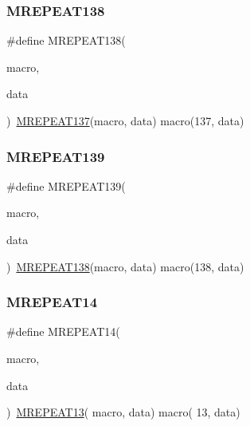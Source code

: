 \mbox{\label{group__group__sam0__utils__mrepeat_ga26e5d13baa4707214f4782d3acc0f231}} 
\subsubsection{\texorpdfstring{MREPEAT138}{MREPEAT138}}
{\footnotesize\ttfamily \#define M\+R\+E\+P\+E\+A\+T138(\begin{DoxyParamCaption}\item[{}]{macro,  }\item[{}]{data }\end{DoxyParamCaption})~\mbox{\hyperlink{group__group__sam0__utils__mrepeat_gaea5f05e5377ed7f7628b6b5bba397523}{M\+R\+E\+P\+E\+A\+T137}}(macro, data)   macro(137, data)}

\mbox{\label{group__group__sam0__utils__mrepeat_gaec99878cdc5458427287a040044924d3}} 
\subsubsection{\texorpdfstring{MREPEAT139}{MREPEAT139}}
{\footnotesize\ttfamily \#define M\+R\+E\+P\+E\+A\+T139(\begin{DoxyParamCaption}\item[{}]{macro,  }\item[{}]{data }\end{DoxyParamCaption})~\mbox{\hyperlink{group__group__sam0__utils__mrepeat_ga26e5d13baa4707214f4782d3acc0f231}{M\+R\+E\+P\+E\+A\+T138}}(macro, data)   macro(138, data)}

\mbox{\label{group__group__sam0__utils__mrepeat_gab75712b9509bac034c07db02ea0e0485}} 
\subsubsection{\texorpdfstring{MREPEAT14}{MREPEAT14}}
{\footnotesize\ttfamily \#define M\+R\+E\+P\+E\+A\+T14(\begin{DoxyParamCaption}\item[{}]{macro,  }\item[{}]{data }\end{DoxyParamCaption})~\mbox{\hyperlink{group__group__sam0__utils__mrepeat_ga235cc5c4e4fb84c9d44ee4b5b5b4a7d1}{M\+R\+E\+P\+E\+A\+T13}}( macro, data)   macro( 13, data)}

